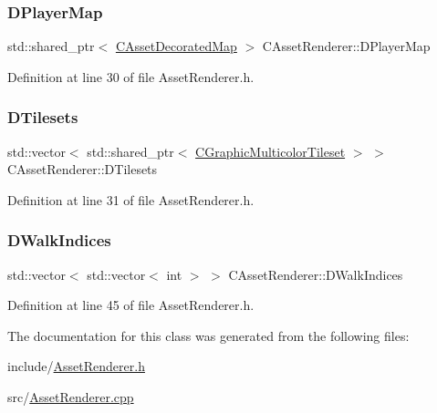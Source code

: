 \subsubsection{\texorpdfstring{D\+Player\+Map}{DPlayerMap}}
{\footnotesize\ttfamily std\+::shared\+\_\+ptr$<$ \hyperlink{classCAssetDecoratedMap}{C\+Asset\+Decorated\+Map} $>$ C\+Asset\+Renderer\+::\+D\+Player\+Map\hspace{0.3cm}{\ttfamily [protected]}}



Definition at line 30 of file Asset\+Renderer.\+h.

\hypertarget{classCAssetRenderer_ae8201de704851c1de6424a8da77b785e}{}\label{classCAssetRenderer_ae8201de704851c1de6424a8da77b785e} 
\subsubsection{\texorpdfstring{D\+Tilesets}{DTilesets}}
{\footnotesize\ttfamily std\+::vector$<$ std\+::shared\+\_\+ptr$<$ \hyperlink{classCGraphicMulticolorTileset}{C\+Graphic\+Multicolor\+Tileset} $>$ $>$ C\+Asset\+Renderer\+::\+D\+Tilesets\hspace{0.3cm}{\ttfamily [protected]}}



Definition at line 31 of file Asset\+Renderer.\+h.

\hypertarget{classCAssetRenderer_a9975fd583c826c9905ccd080659bd3c5}{}\label{classCAssetRenderer_a9975fd583c826c9905ccd080659bd3c5} 
\subsubsection{\texorpdfstring{D\+Walk\+Indices}{DWalkIndices}}
{\footnotesize\ttfamily std\+::vector$<$ std\+::vector$<$ int $>$ $>$ C\+Asset\+Renderer\+::\+D\+Walk\+Indices\hspace{0.3cm}{\ttfamily [protected]}}



Definition at line 45 of file Asset\+Renderer.\+h.



The documentation for this class was generated from the following files\+:\begin{DoxyCompactItemize}
\item 
include/\hyperlink{AssetRenderer_8h}{Asset\+Renderer.\+h}\item 
src/\hyperlink{AssetRenderer_8cpp}{Asset\+Renderer.\+cpp}\end{DoxyCompactItemize}
